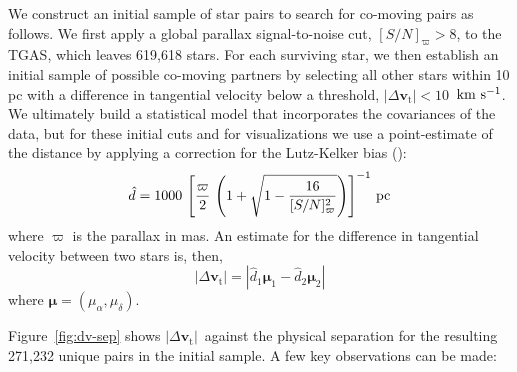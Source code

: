 \documentclass[manuscript, letterpaper]{aastex6}
\newcommand{\acronym}[1]{{\small{#1}}}
\newcommand{\tgas}{\acronym{TGAS}}
\newcommand{\bs}[1]{\boldsymbol{#1}}
\renewcommand{\vec}[1]{\bs{#1}}
\newcommand{\kms}{\ensuremath{\rm km~s^{-1}}}
\newcommand{\snr}{[S/N]_\varpi}
\newcommand{\absdvtan}{\ensuremath{|\Delta\vec v_\mathrm{t}|}}
\begin{document}
We construct an initial sample of star pairs to search for co-moving pairs as
follows.
We first apply a global parallax signal-to-noise cut, $\snr > 8$,  to the \tgas,
which leaves 619,618 stars.
For each surviving star, we then establish an initial sample of possible
co-moving partners by selecting all other stars within 10 pc with a difference
in tangential velocity below a threshold, $\absdvtan < 10$~\kms.
We ultimately build a statistical model that incorporates the covariances of the
data, but for these initial cuts and for visualizations we use a point-estimate
of the distance by applying a correction for the Lutz-Kelker bias
(\citealt{Lutz:1973aa}):
\begin{equation}
  \hat{d} = 1000 \, \left[\frac{\varpi}{2} \,
    \left(1 + \sqrt{1 - \frac{16}{\snr^2}} \right) \right]^{-1} \, {\rm pc}
    \label{eq:dist}
\end{equation}
where $\varpi$ is the parallax in mas.
An estimate for the difference in tangential velocity between two stars is,
then,
\begin{equation}
  \absdvtan = |\hat{d}_1 \vec\mu_1 - \hat{d}_2 \vec\mu_2|
\end{equation}
where $\vec\mu = (\mu_\alpha, \mu_\delta)$.

Figure~\ref{fig:dv-sep} shows \absdvtan\ against the physical separation
for the resulting 271,232 unique pairs in the initial sample.
A few key observations can be made:
\end{document}
